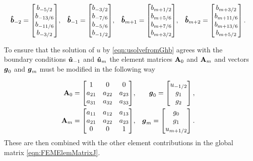 \begin{align*}
\boldsymbol{\hat{b}}_{-2} = \begin{bmatrix}
b_{-5/2} \\ b_{-13/6} \\ b_{-11/6} \\ b_{-3/2}\end{bmatrix}&, &\boldsymbol{\hat{b}}_{-1} = \begin{bmatrix}
b_{-3/2} \\ b_{-7/6} \\ b_{-5/6} \\ b_{-1/2}\end{bmatrix}&, &\boldsymbol{\hat{b}}_{m+1} = \begin{bmatrix}
b_{m+1/2} \\ b_{m+5/6} \\ b_{m+7/6} \\ b_{m+3/2}\end{bmatrix}&, &\boldsymbol{\hat{b}}_{m+2} = \begin{bmatrix}
b_{m+3/2} \\ b_{m+11/6} \\ b_{m+13/6} \\ b_{m+5/2}\end{bmatrix}.
\end{align*}

To ensure that the solution of $u$ by \eqref{eqn:usolvefromGhb} agrees with the boundary conditions $\boldsymbol{\hat{u}}_{-1}$ and $\boldsymbol{\hat{u}}_{m}$ the element matrices $\mathbf{A}_0$ and $\mathbf{A}_m$ and vectors $\boldsymbol{g}_0$ and $\boldsymbol{g}_m$ must be modified in the following way 

\begin{align}
\mathbf{A}_{0} = 
\begin{bmatrix}
1 &0 &0 \\
a_{21} & a_{22} & a_{23} \\
a_{31} & a_{32} & a_{33} \\
\end{bmatrix} &,& \boldsymbol{g}_{0} = \begin{bmatrix}
u_{-1/2} \\
g_1 \\
g_2 \\
\end{bmatrix},\\
\mathbf{A}_{m} = 
\begin{bmatrix}
a_{11} & a_{12} & a_{13} \\
a_{21} & a_{22} & a_{23} \\
0 & 0 & 1 \\
\end{bmatrix} &,& \boldsymbol{g}_{m} = \begin{bmatrix}
g_0\\
g_1 \\
u_{m+1/2} \\
\end{bmatrix}.
\end{align}
These are then combined with the other element contributions in the global matrix \eqref{eqn:FEMElemMatrixJ}.


